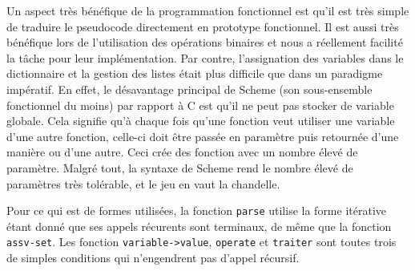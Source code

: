 \documentclass[11pt]{article}
\begin{document}
Un aspect très bénéfique de la programmation fonctionnel est qu’il est très simple de
traduire le pseudocode directement en prototype fonctionnel. Il est aussi très bénéfique lors
de l’utilisation des opérations binaires et nous a réellement facilité la tâche pour leur
implémentation. Par contre, l’assignation des variables dans le dictionnaire et la gestion des
listes était plus difficile que dans un paradigme impératif. En effet, le désavantage principal de Scheme (son sous-ensemble fonctionnel du moins) par rapport à C est qu'il ne peut pas stocker de variable globale. Cela signifie qu'à chaque fois qu'une fonction veut utiliser une variable d'une autre fonction, celle-ci doit être passée en paramètre puis retournée d'une manière ou d'une autre. Ceci crée des fonction avec un nombre élevé de paramètre. Malgré tout, la syntaxe de Scheme rend le nombre élevé de paramètres très tolérable, et le jeu en vaut la chandelle.

Pour ce qui est de formes utilisées, la fonction \texttt{parse} utilise la forme itérative étant donné que ses appels récurents sont terminaux, de même que la fonction \texttt{assv-set}. Les fonction \texttt{variable->value}, \texttt{operate} et \texttt{traiter} sont toutes trois de simples conditions qui n'engendrent pas d'appel récursif.
\end{document}
